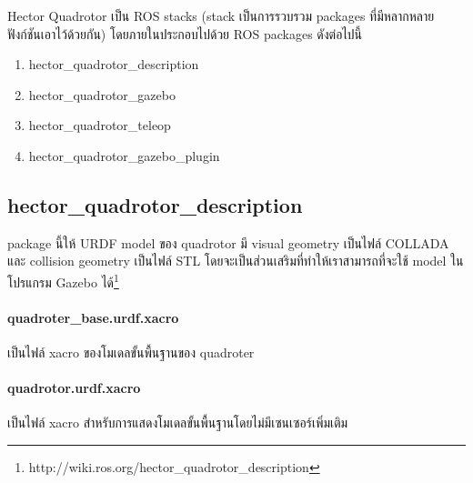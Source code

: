 Hector Quadrotor เป็น ROS stacks (stack เป็นการรวบรวม packages ที่มีหลากหลายฟังก์ชันเอาไว้ด้วยกัน)
โดยภายในประกอบไปด้วย ROS packages ดังต่อไปนี้
\begin{enumerate}[label=\arabic*), leftmargin=1.5cm]
	\setlength\itemsep{-0.25em}
	\item hector\_quadrotor\_description
	\item hector\_quadrotor\_gazebo
	\item hector\_quadrotor\_teleop
	\item hector\_quadrotor\_gazebo\_plugin
\end{enumerate}



\subsection{hector\_quadrotor\_description}
package นี้ให้ URDF model ของ quadrotor มี visual geometry เป็นไฟล์ COLLADA และ collision geometry เป็นไฟล์ STL
โดยจะเป็นส่วนเสริมที่ทำให้เราสามารถที่จะใช้ model ในโปรแกรม Gazebo ได้\footnote{http://wiki.ros.org/hector\_quadrotor\_description}

\paragraph*{quadroter\_base.urdf.xacro}
เป็นไฟล์ xacro ของโมเดลขั้นพื้นฐานของ quadroter
\paragraph*{quadrotor.urdf.xacro}
เป็นไฟล์ xacro สำหรับการแสดงโมเดลขั้นพื้นฐานโดยไม่มีเซนเซอร์เพิ่มเติม
